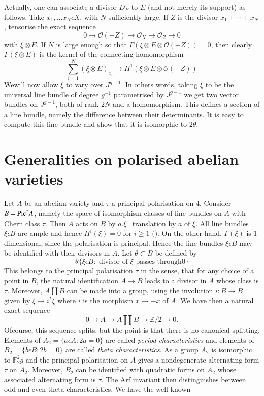 Actually, one can associate a divisor $D_E$ to $E$ (and not merely its
support) as follows. Take $x_1,\ldots x_N\epsilon X$, with $N$
sufficiently large. If $Z$ is the divisor $x_1+\cdots + x_N$,
tensorise the exact sequence 
$$
0\to \mathscr{O}(-Z)\to \mathscr{O}_{X}\to \mathscr{O}_Z\to 0
$$
with $\xi \otimes E$. If $N$ is large enough so that $\Gamma(\xi
\otimes E\otimes \mathscr{O}(-Z))=0$, then clearly $\Gamma(\xi \otimes
E)$ is the kernel of the connecting homomorphism 
$$
\sum\limits_{i=1}^{N}(\xi\otimes E)_{x_{i}}\to H^{1}(\xi\otimes
E\otimes \mathscr{O}(-Z))
$$
We\pageoriginale will now allow $\xi$ to vary over $J^{g-1}$. In others words,
taking $\xi$ to be the universal line bundle of degree $g^{-1}$
parametrised by $J^{g-1}$ we get two vector bundles on $J^{g-1}$, both
of rank $2N$ and a homomorphism. This defines a section of a line
bundle, namely the difference between their determinants. It is easy
to compute this line bundle and show that it is isomorphic to
$2\theta$. 

\section{Generalities on polarised abelian varieties}\label{s3}

Let $A$ be an abelian variety and $\tau$ a principal polarisation on
$4$. Consider $B=\mathrm{Pic} ^{\tau}A$, namely the space of isomorphism
classes of line bundles on $A$ with Chern class $\tau$. Then $A$ acts
on $B$ by $a.\xi$=translation by $a$ of $\xi$. All line bundles $\xi
\epsilon B$ are ample and hence $H^{i}(\xi)=0$ for $i\geq 1$ (\cite[p. 150]{key3}). On the other hand, $\Gamma(\xi)$ is $1$-dimensional, since
the polarisation is principal. Hence the line bundles $\xi\epsilon B$
may be identified with their divisors in $A$. Let $\theta \subset B$
be defined by 
$$
\theta\{\xi \epsilon B: \text{ divisor of } \xi \text{ passes through
} 0\}
$$
This belongs to the principal polarisation $\tau$ in the sense, that
for any choice of a point in $B$, the natural identification $A\to
B$ leads to a divisor in $A$ whose class is $\tau$. Moreover,
$A\coprod B$ can be made into a group, using the involution $i:B\to B$
given by $\xi\to i^{\ast}\xi$ where $i$ is the morphism $x\to -x$ of
$A$. We have then a natural exact sequence 
$$
0\to A\to A\coprod B\to \mathbb{Z}/2 \to 0.
$$
Of\pageoriginale course, this sequence splits, but the point is that there is no
canonical splitting. Elements of $A_2=\{a\epsilon A: 2a=0\}$ are
called \textit{period characteristics} and elements of
$B_2=\{b\epsilon B:2b=0\}$ are called \textit{theta characteristics}. As a
group $A_2$ is isomorphic to $\mathbb{F}^{2}_2g$ and the principal
polarisation on $A$ gives a nondegenerate alternating form $\tau$ on
$A_2$. Moreover, $B_2$ can be identified with quadratic forms on $A_2$
whose associated alternating form is $\tau$. The Arf invariant then
distinguishes between odd and even theta characteristics. We have the
well-known \cite{key4}

